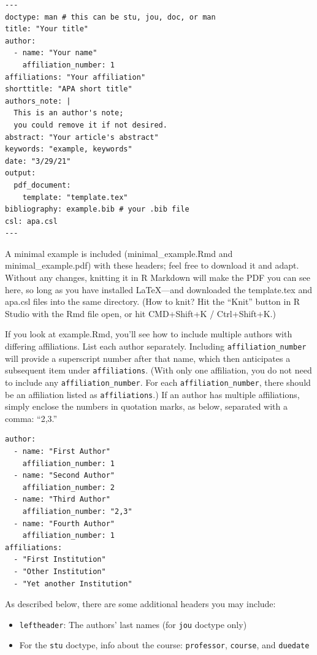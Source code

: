 \documentclass[jou]{apa7}
\providecommand{\tightlist}{%
  \setlength{\itemsep}{0pt}\setlength{\parskip}{0pt}}
\begin{document}
\begin{verbatim}
---
doctype: man # this can be stu, jou, doc, or man
title: "Your title"
author: 
  - name: "Your name"
    affiliation_number: 1
affiliations: "Your affiliation"
shorttitle: "APA short title"
authors_note: |
  This is an author's note; 
  you could remove it if not desired. 
abstract: "Your article's abstract"
keywords: "example, keywords"
date: "3/29/21"
output: 
  pdf_document:
    template: "template.tex"
bibliography: example.bib # your .bib file
csl: apa.csl
---
\end{verbatim}

A minimal example is included (minimal\_example.Rmd and
minimal\_example.pdf) with these headers; feel free to download it and
adapt. Without any changes, knitting it in R Markdown will make the PDF
you can see here, so long as you have installed LaTeX---and downloaded
the template.tex and apa.csl files into the same directory. (How to
knit? Hit the ``Knit'' button in R Studio with the Rmd file open, or hit
CMD+Shift+K / Ctrl+Shift+K.)

If you look at example.Rmd, you'll see how to include multiple authors
with differing affiliations. List each author separately. Including
\texttt{affiliation\_number} will provide a superscript number after
that name, which then anticipates a subsequent item under
\texttt{affiliations}. (With only one affiliation, you do not need to
include any \texttt{affiliation\_number}. For each
\texttt{affiliation\_number}, there should be an affiliation listed as
\texttt{affiliations}.) If an author has multiple affiliations, simply
enclose the numbers in quotation marks, as below, separated with a
comma: ``2,3.''

\begin{verbatim}
author: 
  - name: "First Author"
    affiliation_number: 1
  - name: "Second Author"
    affiliation_number: 2
  - name: "Third Author"
    affiliation_number: "2,3"
  - name: "Fourth Author"
    affiliation_number: 1
affiliations:
  - "First Institution"
  - "Other Institution"
  - "Yet another Institution"
\end{verbatim}

As described below, there are some additional headers you may include:

\begin{itemize}
\tightlist
\item
  \texttt{leftheader}: The authors' last names (for \texttt{jou} doctype
  only)
\item
  For the \texttt{stu} doctype, info about the course:
  \texttt{professor}, \texttt{course}, and \texttt{duedate}
\end{itemize}
\end{document}
